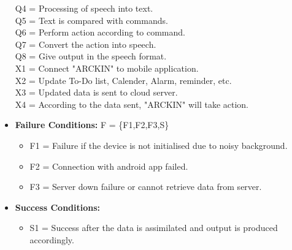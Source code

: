 \documentclass[16pt,oneside,a4paper]{article}
\begin{document}
\begin{itemize}
    \newline
    Q4 = Processing of speech into text.\\
    \newline 
    Q5 = Text is compared with commands.\\
    \newline
    Q6 = Perform action according to command.\\
    \newline 
    Q7 = Convert the action into speech.\\
    \newline 
    Q8 = Give output in the speech format.\\
    \newline
    X1 = Connect "ARCKIN" to mobile application.\\
    \newline
    X2 = Update To-Do list, Calender, Alarm, reminder, etc.\\
    \newline
    X3 = Updated data is sent to cloud server.\\
    \newline
    X4 = According to the data sent, "ARCKIN" will take action.\\
    \newline
    
\item \textbf{Failure Conditions:}  F = \{F1,F2,F3,S\} \newline
\begin{itemize}
\item F1  = Failure if the device is not initialised due to noisy background.
\item F2 = Connection with android app failed.
\item F3 = Server down failure or cannot retrieve data from server.
\end{itemize}

\item \textbf{Success Conditions:}
    \begin{itemize}
    		\item S1 = Success after the data is assimilated and output is produced accordingly.
	\end{itemize}     


\end{itemize}
\end{document}
